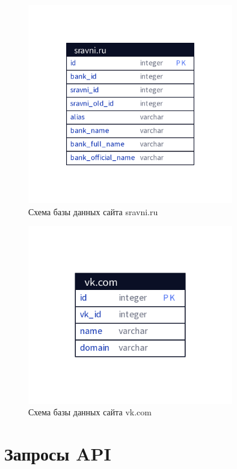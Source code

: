 \documentclass[PI, VKR]{HSEUniversity}
\begin{document}
\begin{figure}[h!]
\centering
\includegraphics[width=0.8\textwidth]{img/d2/sravni_ru.png}
\caption{\label{fig:database_sravni_ru}Схема базы данных сайта sravni.ru}
\end{figure}

\begin{figure}[h!]
\centering
\includegraphics[width=0.8\textwidth]{img/d2/vk_com.png}
\caption{\label{fig:database_vk_com}Схема базы данных сайта vk.com}
\end{figure}

\chapter{Запросы API}
\label{sec:orgfa11da6}

\end{document}
